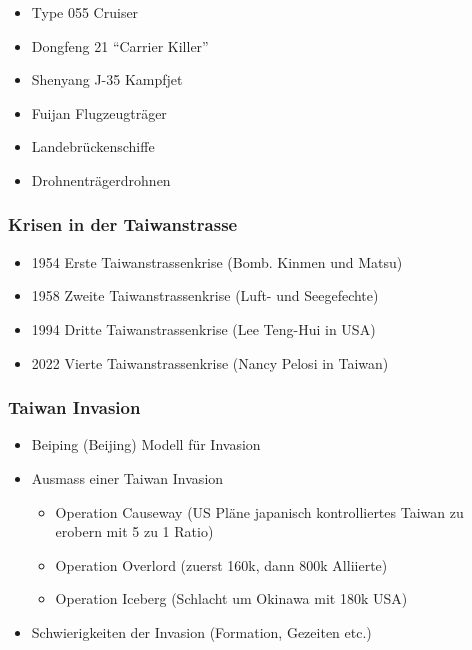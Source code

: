 {}\documentclass[a4paper]{article}
\providecommand{\tightlist}{\setlength{\itemsep}{1mm}\setlength{\parskip}{1mm}}
\begin{document}
\begin{itemize}
	\tightlist
	\item
	      Type 055 Cruiser
	\item
	      Dongfeng 21 ``Carrier Killer''
	\item
	      Shenyang J-35 Kampfjet
	\item
	      Fuijan Flugzeugträger
	\item
	      Landebrückenschiffe
	\item
	      Drohnenträgerdrohnen
\end{itemize}

\subsubsection{Krisen in der
	Taiwanstrasse}\label{krisen-in-der-taiwanstrasse}

\begin{itemize}
	\tightlist
	\item
	      1954 Erste Taiwanstrassenkrise (Bomb. Kinmen und Matsu)
	\item
	      1958 Zweite Taiwanstrassenkrise (Luft- und Seegefechte)
	\item
	      1994 Dritte Taiwanstrassenkrise (Lee Teng-Hui in USA)
	\item
	      2022 Vierte Taiwanstrassenkrise (Nancy Pelosi in Taiwan)
\end{itemize}

\subsubsection{Taiwan Invasion}\label{taiwan-invasion}

\begin{itemize}
	\tightlist
	\item
	      Beiping (Beijing) Modell für Invasion
	\item
	      Ausmass einer Taiwan Invasion

	      \begin{itemize}
		      \tightlist
		      \item
		            Operation Causeway (US Pläne japanisch kontrolliertes Taiwan zu
		            erobern mit 5 zu 1 Ratio)
		      \item
		            Operation Overlord (zuerst 160k, dann 800k Alliierte)
		      \item
		            Operation Iceberg (Schlacht um Okinawa mit 180k USA)
	      \end{itemize}
	\item
	      Schwierigkeiten der Invasion (Formation, Gezeiten etc.)
\end{itemize}
\end{document}
